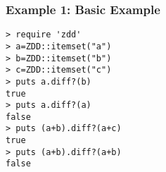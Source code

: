 \subsubsection*{Example 1: Basic Example}



\begin{Verbatim}[baselinestretch=0.7,frame=single]
> require 'zdd'
> a=ZDD::itemset("a")
> b=ZDD::itemset("b")
> c=ZDD::itemset("c")
> puts a.diff?(b)
true
> puts a.diff?(a)
false
> puts (a+b).diff?(a+c)
true
> puts (a+b).diff?(a+b)
false
\end{Verbatim}
